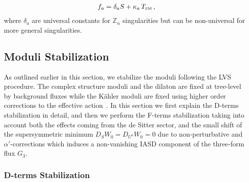 \documentclass[12pt,a4paper]{book}
\def\SM{{\scriptscriptstyle \rm SM}}
\begin{document}
\begin{align}
f_a=\delta_a S+ \kappa_a \,T_\SM\, ,
\label{eq:gaugekineticf}
\end{align}
where $\delta_a$ are universal constants for $\mathbb{Z}_n$ singularities but can be non-universal for more general singularities.\\

\subsection{Moduli Stabilization}

As outlined earlier in this section, we stabilize the moduli following the LVS procedure. The complex structure moduli and the dilaton are fixed at tree-level by background fluxes while the K\"ahler moduli are fixed using higher order corrections to the effective action~\cite{Cicoli:2013cha}. In this section we first explain the D-terms stabilization in detail, and then we perform the F-terms stabilization taking into account both the effects coming from the de Sitter sector, and the small shift of the supersymmetric minimum $D_S W_0 = D_{U^a} W_0 = 0$ due to non-perturbative and $\alpha'$-corrections which induces a non-vanishing IASD component of the three-form flux $G_3$.

\subsubsection{D-terms Stabilization}
\label{sssec:Shrinking}
\end{document}
